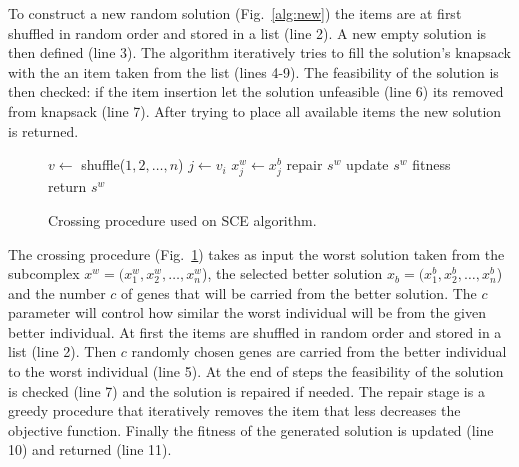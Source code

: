 To construct a new random solution (Fig.~\ref{alg:new}) the items are
at first shuffled in random order and stored in a list (line 2).
A new empty solution is then defined (line 3).
The algorithm iteratively tries to fill the solution's knapsack with 
the an item taken from the list (lines 4-9).
The feasibility of the solution is then checked: if the item insertion let
the solution unfeasible (line 6) its removed from knapsack (line 7).
After trying to place all available items the new solution is returned.

\begin{figure}
\begin{algorithmic}[1]
    \State $v \leftarrow $ shuffle($1, 2, \ldots, n$)
	  \State $j \leftarrow v_i$
	  \State $x^w_j \leftarrow x^b_j$ 
	\EndFor
	  \State repair $s^w$
	\EndIf
	\State update $s^w$ fitness
  \State return $s^w$
  \EndProcedure
\end{algorithmic}
\caption{Crossing procedure used on SCE algorithm.}
\label{alg:cross}
\end{figure}

\newpage
The crossing procedure (Fig.~\ref{alg:cross}) takes as input the worst
solution taken from the subcomplex $x^w = (x^w_1, x^w_2, \ldots, x^w_n$),
the selected better solution $x_b = (x^b_1, x^b_2, \ldots, x^b_n$)
and the number $c$ of genes that will be carried from the better solution.
The $c$ parameter will control how similar the worst individual will be from the
given better individual.
At first the items are shuffled in random order and stored in a list (line 2).
Then $c$ randomly chosen genes are carried from the better individual to the worst
individual (line 5).
At the end of steps the feasibility of the solution is checked (line 7) and
the solution is repaired if needed.
The repair stage is a greedy procedure that iteratively removes the item that less
decreases the objective function.
Finally the fitness of the generated solution is updated (line 10) and
returned (line 11).

